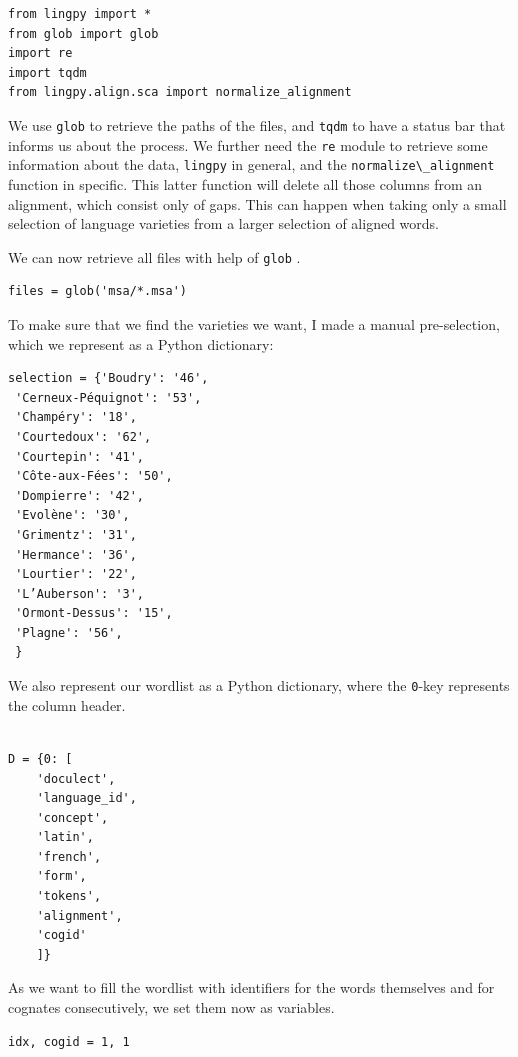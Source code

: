 \documentclass[
  a4paper,
  14pt,
  oneside,
  tablecaptionabove
]{scrbook}
\newcommand{\passthrough}[1]{#1}
\begin{document}
\begin{lstlisting}
from lingpy import *
from glob import glob
import re
import tqdm
from lingpy.align.sca import normalize_alignment
\end{lstlisting}

We use \passthrough{\lstinline!glob!} to retrieve the paths of the
files, and \passthrough{\lstinline!tqdm!} to have a status bar that
informs us about the process. We further need the
\passthrough{\lstinline!re!} module to retrieve some information about
the data, \passthrough{\lstinline!lingpy!} in general, and the
\passthrough{\lstinline!normalize\_alignment!} function in specific.
This latter function will delete all those columns from an alignment,
which consist only of gaps. This can happen when taking only a small
selection of language varieties from a larger selection of aligned
words.

We can now retrieve all files with help of
\passthrough{\lstinline!glob!} .

\begin{lstlisting}
files = glob('msa/*.msa')
\end{lstlisting}

To make sure that we find the varieties we want, I made a manual
pre-selection, which we represent as a Python dictionary:

\begin{lstlisting}
selection = {'Boudry': '46',
 'Cerneux-Péquignot': '53',
 'Champéry': '18',
 'Courtedoux': '62',
 'Courtepin': '41',
 'Côte-aux-Fées': '50',
 'Dompierre': '42',
 'Evolène': '30',
 'Grimentz': '31',
 'Hermance': '36',
 'Lourtier': '22',
 'L’Auberson': '3',
 'Ormont-Dessus': '15',
 'Plagne': '56',
 }
\end{lstlisting}

We also represent our wordlist as a Python dictionary, where the
\passthrough{\lstinline!0!}-key represents the column header.\\
~\\

\begin{lstlisting}
D = {0: [
    'doculect',
    'language_id',
    'concept',
    'latin',
    'french',
    'form',
    'tokens',
    'alignment',
    'cogid'
    ]}
\end{lstlisting}

As we want to fill the wordlist with identifiers for the words
themselves and for cognates consecutively, we set them now as variables.

\begin{lstlisting}
idx, cogid = 1, 1
\end{lstlisting}
\end{document}
